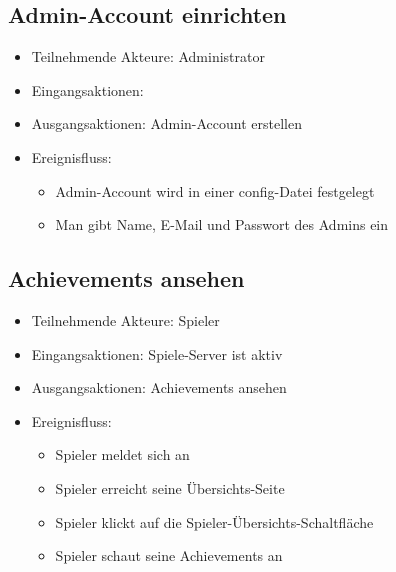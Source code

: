 \documentclass[a4paper]{scrreprt}
\begin{document}
    \subsection{Admin-Account einrichten}
    \begin{itemize}
        \item Teilnehmende Akteure: \Gls{Administrator}
        \item Eingangsaktionen: %
        \item Ausgangsaktionen: Admin-Account erstellen
        \item Ereignisfluss:
        \begin{itemize}
            \item Admin-Account wird in einer config-Datei festgelegt
            \item Man gibt Name, E-Mail und Passwort des Admins ein
        \end{itemize}
    \end{itemize}

    \subsection{Achievements ansehen}
    \begin{itemize}
        \item Teilnehmende Akteure: \Gls{Spieler}
        \item Eingangsaktionen: Spiele-Server ist aktiv
        \item Ausgangsaktionen: Achievements ansehen
        \item Ereignisfluss:
        \begin{itemize}
            \item Spieler meldet sich an
            \item Spieler erreicht seine Übersichts-Seite
            \item Spieler klickt auf die Spieler-Übersichts-Schaltfläche
            \item Spieler schaut seine Achievements an
        \end{itemize}
    \end{itemize}
\end{document}
